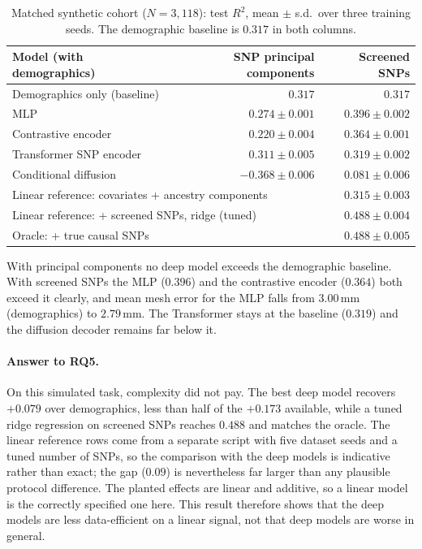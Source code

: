 \begin{table}[t]
\centering
\caption{Matched synthetic cohort ($N=3{,}118$): test $R^2$, mean $\pm$ s.d.\
over three training seeds. The demographic baseline is $0.317$ in both columns.}
\label{tab:rq5}
\begin{tabular}{lrr}
\toprule
Model (with demographics) & SNP principal components & Screened SNPs \\
\midrule
Demographics only (baseline) & $0.317$ & $0.317$ \\
MLP                          & $0.274\pm0.001$ & $\mathbf{0.396\pm0.002}$ \\
Contrastive encoder          & $0.220\pm0.004$ & $0.364\pm0.001$ \\
Transformer SNP encoder      & $0.311\pm0.005$ & $0.319\pm0.002$ \\
Conditional diffusion        & $-0.368\pm0.006$ & $0.081\pm0.006$ \\
\midrule
\multicolumn{2}{l}{Linear reference: covariates + ancestry components} & $0.315\pm0.003$ \\
\multicolumn{2}{l}{Linear reference: + screened SNPs, ridge (tuned)}   & $0.488\pm0.004$ \\
\multicolumn{2}{l}{Oracle: + true causal SNPs}                         & $0.488\pm0.005$ \\
\bottomrule
\end{tabular}
\end{table}

With principal components no deep model exceeds the demographic baseline. With
screened SNPs the MLP ($0.396$) and the contrastive encoder ($0.364$) both
exceed it clearly, and mean mesh error for the MLP falls from $3.00$\,mm
(demographics) to $2.79$\,mm. The Transformer stays at the baseline ($0.319$)
and the diffusion decoder remains far below it.

\paragraph{Answer to RQ5.}
On this simulated task, complexity did not pay. The best deep model recovers
$+0.079$ over demographics, less than half of the $+0.173$ available, while a
tuned ridge regression on screened SNPs reaches $0.488$ and matches the oracle.
The linear reference rows come from a separate script with five dataset seeds
and a tuned number of SNPs, so the comparison with the deep models is indicative
rather than exact; the gap ($0.09$) is nevertheless far larger than any
plausible protocol difference. The planted effects are linear and additive, so
a linear model is the correctly specified one here. This result therefore shows
that the deep models are less data-efficient on a linear signal, not that deep
models are worse in general.

